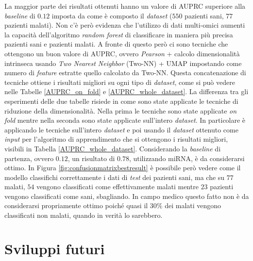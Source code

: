 \documentclass[12pt,italian]{report}
\begin{document}
	La maggior parte dei risultati ottenuti hanno un valore di AUPRC superiore alla \textit{baseline} di $0.12$ imposta da come è composto il \textit{dataset} ($550$ pazienti sani, $77$ pazienti malati). Non c'è però evidenza che l'utilizzo di dati multi-omici aumenti la capacità dell'algoritmo \textit{random forest} di classificare in maniera più precisa pazienti sani e pazienti malati. A fronte di questo però ci sono tecniche che ottengono un buon valore di AUPRC, ovvero \textit{Pearson} + calcolo dimensionalità intrinseca usando \textit{Two Nearest Neighbor} (Two-NN) + UMAP impostando come numero di \textit{feature} estratte quello calcolato da Two-NN.
	Questa concatenazione di tecniche ottiene i risultati migliori su ogni tipo di \textit{dataset}, come si può vedere nelle Tabelle \ref{AUPRC_on_fold} e \ref{AUPRC_whole_dataset}. La differenza tra gli esperimenti delle due tabelle risiede in come sono state applicate le tecniche di riduzione della dimensionalità. Nella prima le tecniche sono state applicate \textit{on fold} mentre nella seconda sono state applicate sull'intero \textit{dataset}.
	In particolare è applicando le tecniche sull'intero \textit{dataset} e poi usando il \textit{dataset} ottenuto come \textit{input} per l'algoritmo di apprendimento che si ottengono i risultati migliori, visibili in Tabella \ref{AUPRC_whole_dataset}. Considerando la \textit{baseline} di partenza, ovvero $0.12$, un risultato di $0.78$, utilizzando miRNA, è da considerarsi ottimo. In Figura \ref{fig:confusionmatrixbestresult} è possibile però vedere come il modello classifichi correttamente i dati di \textit{test} dei pazienti sani, ma che su $77$ malati, $54$ vengono classificati come effettivamente malati mentre $23$ pazienti vengono classificati come sani, sbagliando. In campo medico questo fatto non è da considerarsi propriamente ottimo poiché quasi il $30\%$ dei malati vengono classificati non malati, quando in verità lo sarebbero.
	
	\section{Sviluppi futuri}
	
\end{document}
